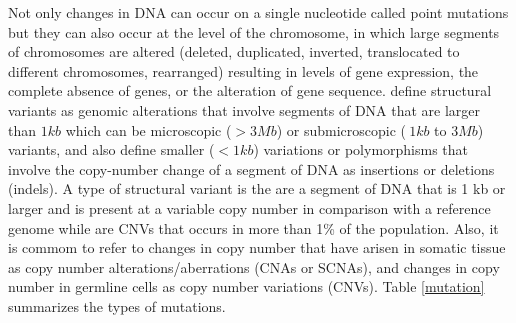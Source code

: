 Not only changes in DNA can occur on a single nucleotide called point mutations but they can
also occur at the level of the chromosome, in which large segments of chromosomes are altered
(deleted, duplicated, inverted, translocated to different chromosomes, rearranged)
resulting in levels of gene expression, the complete absence of genes, or the alteration of gene sequence.
 define structural variants as genomic alterations that involve segments
of DNA that are larger than $1 kb$ which can be microscopic ($> 3Mb$) or submicroscopic ($~1 kb$ to $3 Mb$) variants,
and also define smaller ($<1 kb$) variations or polymorphisms that involve the copy-number change
 of a segment of DNA as insertions or deletions (indels).
A type of structural variant is the  are a segment of DNA that is 1 kb or larger and is present at a variable copy number in comparison with a reference genome while  are CNVs that occurs in more than 1\% of the population. Also, it is commom to refer to changes in copy number that have arisen in somatic tissue as copy number alterations/aberrations (CNAs or SCNAs), and changes in copy number in germline cells
 as copy number variations (CNVs).
Table \ref{mutation} summarizes the types of mutations.




